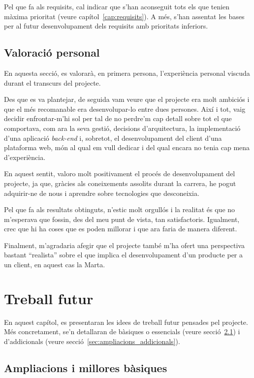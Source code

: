 \documentclass[a4paper,12pt]{ThesisStyle}
\begin{document}
Pel que fa als requisits, cal indicar que s'han aconseguit tots els que tenien màxima prioritat (veure capítol~\ref{cap:requisits}). A més, s'han assentat les bases per al futur desenvolupament dels requisits amb prioritats inferiors.

\section{Valoració personal}
\label{sec:valoracio}

En aquesta secció, es valorarà, en primera persona, l'experiència personal viscuda durant el transcurs del projecte.

Des que es va plantejar, de seguida vam veure que el projecte era molt ambiciós i que el més recomanable era desenvolupar-lo entre dues persones. Així i tot, vaig decidir enfrontar-m'hi sol per tal de no perdre'm cap detall sobre tot el que comportava, com ara la seva gestió, decisions d'arquitectura, la implementació d'una aplicació \textit{back-end} i, sobretot, el desenvolupament del client d'una plataforma web, món al qual em vull dedicar i del qual encara no tenia cap mena d'experiència.

En aquest sentit, valoro molt positivament el procés de desenvolupament del projecte, ja que, gràcies als coneixements assolits durant la carrera, he pogut adquirir-ne de nous i aprendre sobre tecnologies que desconeixia.

Pel que fa als resultats obtinguts, n'estic molt orgullós i la realitat és que no m'esperava que fossin, des del meu punt de vista, tan satisfactoris. Igualment, crec que hi ha coses que es poden millorar i que ara faria de manera diferent.

Finalment, m'agradaria afegir que el projecte també m'ha ofert una perspectiva bastant ``realista'' sobre el que implica el desenvolupament d'un producte per a un client, en aquest cas la Marta.


\chapter{Treball futur}
\label{cap:treball_futur}

En aquest capítol, es presentaran les idees de treball futur pensades pel projecte. Més concretament, se'n detallaran de bàsiques o essencials (veure secció~\ref{sec:ampliacions_basiques}) i d'addicionals (veure secció~\ref{sec:ampliacions_addicionals}).

\section{Ampliacions i millores bàsiques}
\label{sec:ampliacions_basiques}
\end{document}
